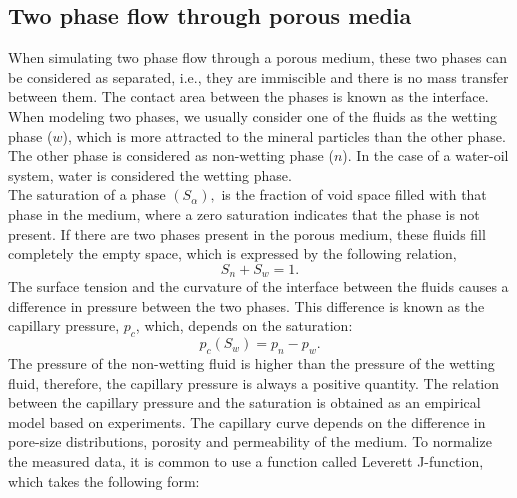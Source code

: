 \documentclass[12pt]{article}
\begin{document}
 \subsection{Two phase flow through porous media}\label{fpm}
When simulating two phase flow through a porous medium, these two phases can be considered as separated, i.e., they are immiscible and there is no mass transfer between them. 
The contact area between the phases is known as the interface.\\ 
When modeling two phases, we 
usually consider one of the fluids as the wetting phase ($w$), which is more attracted to the mineral particles than the other phase.
The other phase is considered as non-wetting phase ($n$). In the case of a water-oil system, water is considered
the wetting phase. \\
The saturation of a phase $(S_{\alpha}),$ is the fraction of void space filled with that phase in the 
medium, where a zero saturation indicates that the phase is not present.
If there are two phases present in the porous medium, these fluids fill completely the empty space, which is
expressed by the following relation,
\begin{equation}\label{eq:satrel}
 S_n+S_w=1.
\end{equation}
The surface tension and the curvature of the interface between the fluids causes a difference in pressure
between the two phases. 
This difference is known as the capillary pressure, $p_c$, which, depends on the saturation:
\begin{equation}\label{eq:cappress}
 p_c(S_w)=p_n-p_w.
\end{equation}
The pressure of the non-wetting fluid is higher than the pressure of the wetting fluid, 
therefore, the capillary pressure is always a positive quantity. 
The relation between the capillary pressure and the saturation is obtained as an empirical model based on experiments. 
The capillary curve depends on the difference in pore-size 
distributions, porosity and permeability of the medium.
To normalize the measured data, it is common to use a function called Leverett J-function, which takes the following 
form:
\end{document}
